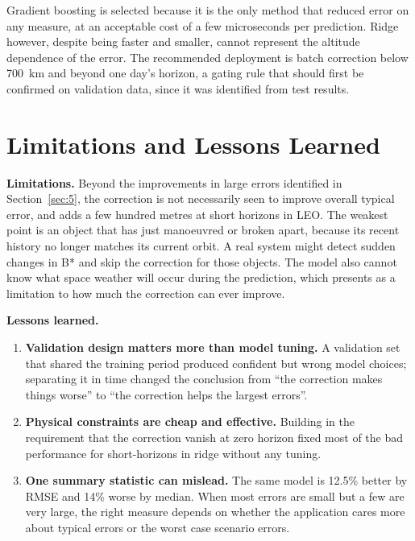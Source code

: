 \documentclass[11pt, a4paper]{article}
\begin{document}
Gradient boosting is selected because it is the only method that reduced error on any measure, at an acceptable cost of a few microseconds per prediction. Ridge however, despite being faster and smaller, cannot represent the altitude dependence of the error. The recommended deployment is batch correction below 700~km and beyond one day's horizon, a gating rule that should first be confirmed on validation data, since it was identified from test results.

\section{Limitations and Lessons Learned}\label{sec:7}

\textbf{Limitations.} Beyond the improvements in large errors identified in Section~\ref{sec:5}, the correction is not necessarily seen to improve overall typical error, and adds a few hundred metres at short horizons in LEO. The weakest point is an object that has just manoeuvred or broken apart, because its recent history no longer matches its current orbit. A real system might detect sudden changes in B* and skip the correction for those objects. The model also cannot know what space weather will occur during the prediction, which presents as a limitation to how much the correction can ever improve.

\textbf{Lessons learned.}
\begin{enumerate}
\item \textbf{Validation design matters more than model tuning.} A validation set that shared the training period produced confident but wrong model choices; separating it in time changed the conclusion from ``the correction makes things worse'' to ``the correction helps the largest errors''.
\item \textbf{Physical constraints are cheap and effective.} Building in the requirement that the correction vanish at zero horizon fixed most of the bad performance for short-horizons in ridge without any tuning.
\item \textbf{One summary statistic can mislead.} The same model is 12.5\% better by RMSE and 14\% worse by median. When most errors are small but a few are very large, the right measure depends on whether the application cares more about typical errors or the worst case scenario errors.
\end{enumerate}
\end{document}

